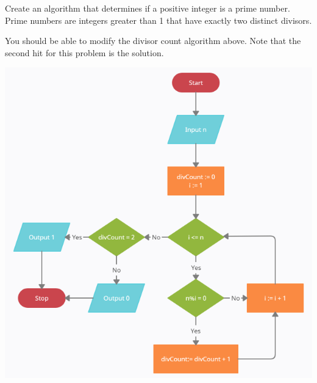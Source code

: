 \documentclass{ximera}
\begin{document}
\begin{question}
	Create an algorithm that determines if a positive integer is a prime number. Prime numbers are integers greater than 1 that have exactly two distinct divisors.
	\begin{hint}
		You should be able to modify the divisor count algorithm above. Note that the second hit for this problem is the solution.
	\end{hint}
	\begin{hint}
	\begin{center}
		\includegraphics{primes.png}
	\end{center}
	\end{hint}
\end{question}
\end{document}
